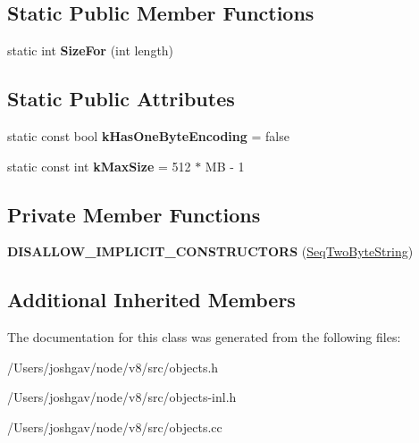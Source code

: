 \subsection*{Static Public Member Functions}
\begin{DoxyCompactItemize}
\item 
static int {\bfseries Size\+For} (int length)\hypertarget{classv8_1_1internal_1_1_seq_two_byte_string_a310700be9011633ec0da472bb31c16a9}{}\label{classv8_1_1internal_1_1_seq_two_byte_string_a310700be9011633ec0da472bb31c16a9}

\end{DoxyCompactItemize}
\subsection*{Static Public Attributes}
\begin{DoxyCompactItemize}
\item 
static const bool {\bfseries k\+Has\+One\+Byte\+Encoding} = false\hypertarget{classv8_1_1internal_1_1_seq_two_byte_string_ad26ef1753e8b390ca91d9d4d7627b01a}{}\label{classv8_1_1internal_1_1_seq_two_byte_string_ad26ef1753e8b390ca91d9d4d7627b01a}

\item 
static const int {\bfseries k\+Max\+Size} = 512 $\ast$ MB -\/ 1\hypertarget{classv8_1_1internal_1_1_seq_two_byte_string_aea5b549a060721065740b5c3585a4cac}{}\label{classv8_1_1internal_1_1_seq_two_byte_string_aea5b549a060721065740b5c3585a4cac}

\end{DoxyCompactItemize}
\subsection*{Private Member Functions}
\begin{DoxyCompactItemize}
\item 
{\bfseries D\+I\+S\+A\+L\+L\+O\+W\+\_\+\+I\+M\+P\+L\+I\+C\+I\+T\+\_\+\+C\+O\+N\+S\+T\+R\+U\+C\+T\+O\+RS} (\hyperlink{classv8_1_1internal_1_1_seq_two_byte_string}{Seq\+Two\+Byte\+String})\hypertarget{classv8_1_1internal_1_1_seq_two_byte_string_aea5b15ec6e0b445f34dabf4588e03082}{}\label{classv8_1_1internal_1_1_seq_two_byte_string_aea5b15ec6e0b445f34dabf4588e03082}

\end{DoxyCompactItemize}
\subsection*{Additional Inherited Members}


The documentation for this class was generated from the following files\+:\begin{DoxyCompactItemize}
\item 
/\+Users/joshgav/node/v8/src/objects.\+h\item 
/\+Users/joshgav/node/v8/src/objects-\/inl.\+h\item 
/\+Users/joshgav/node/v8/src/objects.\+cc\end{DoxyCompactItemize}

